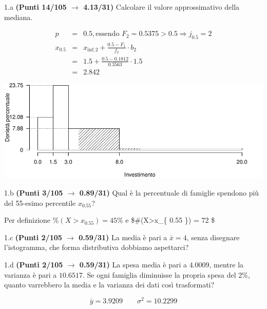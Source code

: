 \documentclass[
  11pt,
]{book}
\theoremstyle{mytheoremstyle}
\theoremstyle{mydefstyle}
\newenvironment{sol}
  {
  \begin{tcolorbox}[enhanced,breakable,arc=0.1mm,boxrule=1pt,colback=white,colframe=iblue,
  title=\bf \fontfamily{lmss}\selectfont \hspace{.5 cm} Soluzione,drop fuzzy shadow]

}{
\end{tcolorbox}
  }
\begin{document}
1.a \textbf{(Punti 14/105 \(\rightarrow\) 4.13/31)} Calcolare il valore approssimativo della mediana.

\begin{sol}

\begin{eqnarray*}
  p &=&  0.5 , \text{essendo }F_{ 2 }= 0.5375  > 0.5  \Rightarrow j_{ 0.5 }= 2 \\
  x_{ 0.5 } &=& x_{\text{inf}; 2 } + \frac{ { 0.5 } - F_{ 1 }} {f_{ 2 }} \cdot b_{ 2 } \\
            &=&  1.5  + \frac {{ 0.5 } -  0.1812 } { 0.3563 } \cdot  1.5  \\
            &=&  2.842 
\end{eqnarray*}

\begin{center}\includegraphics{Esami_passati_con_soluzioni_files/figure-latex/2024-95-1} \end{center}

\end{sol}

1.b \textbf{(Punti 3/105 \(\rightarrow\) 0.89/31)} Qual è la percentuale di famiglie spendono più del 55-esimo percentile \(x_{0.55}\)?

\begin{sol}
Per definizione \(\%(X>x_{ 0.55 })= 45 \%\) e
\$\#(X\textgreater x\_\{ 0.55 \})  = 72 \$

\end{sol}

1.c \textbf{(Punti 2/105 \(\rightarrow\) 0.59/31)} La media è pari a \(\bar x=4\), senza disegnare l'istogramma, che forma distributiva dobbiamo aspettarci?

1.d \textbf{(Punti 2/105 \(\rightarrow\) 0.59/31)} La spesa media è pari a \(4.0009\), mentre la varianza è pari a \(10.6517\).
Se ogni famiglia diminuisse la propria spesa del 2\%, quanto varrebbero la media e la varianza dei dati così trasformati?

\begin{sol}
\[
\bar y = 3.9209\qquad \sigma^2 = 10.2299
\]

\end{sol}
\end{document}
